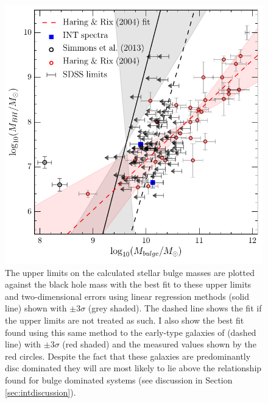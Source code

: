 {\begin{figure}
\centering
\includegraphics[width=\textwidth]{agn/mass_bh_bulge_limits_INT_simmons13_measurements_linmix_fit.pdf}
\caption[Black hole bulge mass relation for the \textsc{bulgeless} sample]{The upper limits on the calculated stellar bulge masses are plotted against the black hole mass with the best fit to these upper limits and two-dimensional errors using linear regression methods (solid line) shown with $\pm3\sigma$ (grey shaded). The dashed line shows the fit if the upper limits are not treated as such. I also show the best fit found using this same method to the early-type galaxies of \citet{haringrix04} (dashed line) with $\pm3\sigma$ (red shaded) and the measured values shown by the red circles. Despite the fact that these galaxies are predominantly disc dominated they will are most likely to lie above the \citet{haringrix04} relationship found for bulge dominated systems (see discussion in Section \ref{sec:intdiscussion}).
}
\label{fig:bulgevsbh}
\end{figure}

}

